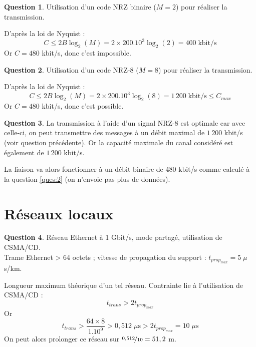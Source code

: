 \documentclass[11pt,english,french]{scrreprt}
\theoremstyle{remark}
\theoremstyle{definition}
\newtheorem{ques}{Question}[section]
\begin{document}
\begin{ques}
	Utilisation d'un code NRZ binaire ($M=2$) pour réaliser la transmission.
	
	D'après la loi de Nyquist :\[C \leqslant 2B\log_2(M) = 2\times 200.10^3\log_2(2) = 400\;\textrm{kbit/s}\]
	Or $C=480$ kbit/s, donc c'est impossible.
\end{ques}

\begin{ques}
	Utilisation d'un code NRZ-8 ($M=8$) pour réaliser la transmission.
	
	D'après la loi de Nyquist : \[C \leqslant 2B\log_2(M) = 2\times 200.10^3\log_2(8) = 1\,200\;\textrm{kbit/s} \leqslant C_{max}\]
	Or $C=480$ kbit/s, donc c'est possible.
\end{ques}

\begin{ques}
	La transmission à l'aide d'un signal NRZ-8 est optimale car avec celle-ci, on peut transmettre des messages à un débit maximal de $1\,200$ kbit/s (voir question précédente). Or la capacité maximale du canal considéré est également de $1\,200$ kbit/s.
	
	La liaison va alors fonctionner à un débit binaire de 480 kbit/s comme calculé à la question \ref{ques:2} (on n'envoie pas plus de données).
\end{ques}

\clearpage

\section{Réseaux locaux} %

\begin{ques}
	Réseau Ethernet à 1 Gbit/s, mode partagé, utilisation de CSMA/CD.\\
	Trame Ethernet > 64 octets ; vitesse de propagation du support : $t_{prop_{max}} = 5\;\mu$s/km. 
	
	Longueur maximum théorique d'un tel réseau. Contrainte lie à l'utilisation de CSMA/CD : \[t_{trans} > 2 t_{prop_{max}}\]
	Or \[t_{trans} > \frac{64\times 8}{1.10^9} > 0,512\;\mu\textrm{s} > 2 t_{prop_{max}} = 10\;\mu\textrm{s}\]
	On peut alors prolonger ce réseau sur $\nicefrac{0,512}{10}=51,2$ m.
\end{ques}
\end{document}

